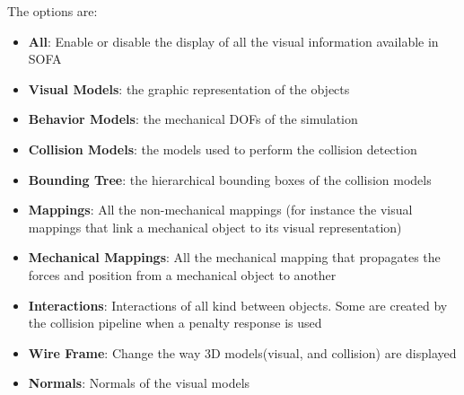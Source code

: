 The options are:
\begin{itemize}
 \item {\bf All}: Enable or disable the display of all the visual information available in SOFA
 \item {\bf Visual Models}: the graphic representation of the objects
\item {\bf Behavior Models}: the mechanical DOFs of the simulation
\item {\bf Collision Models}: the models used to perform the collision detection
\item {\bf Bounding Tree}: the hierarchical bounding boxes of the collision models
\item {\bf Mappings}: All the non-mechanical mappings (for instance the visual mappings that link a mechanical object to its visual representation)
\item {\bf Mechanical Mappings}: All the mechanical mapping that propagates the forces and position from a mechanical object to another
\item {\bf Interactions}: Interactions of all kind between objects. Some are created by the collision pipeline when a penalty response is used
\item {\bf Wire Frame}: Change the way 3D models(visual, and collision) are displayed
\item {\bf Normals}: Normals of the visual models
\end{itemize}








